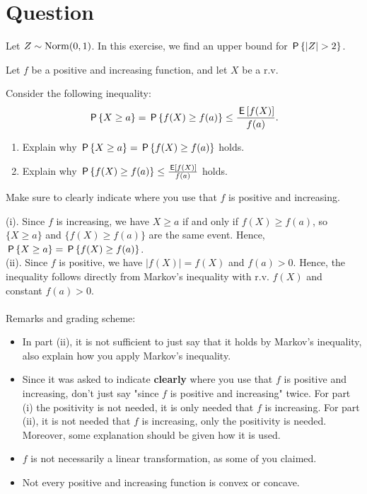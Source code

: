 \section{Question}

Let $Z \sim \Norm{0,1}$. 
In this exercise, we find an upper bound for $\P{|Z| > 2}$.

\begin{exercise}[1.5]
 Let $f$ be a positive and increasing function, and let $X$ be a r.v. 

Consider the following inequality:
$$\P{X \geq a} = \P{f(X) \geq f(a)}   \leq \frac{\E{f(X)}}{f(a)}.$$
\begin{enumerate}
\item[(i)] Explain why $\P{X \geq a} = \P{f(X) \geq f(a)}$ holds. 
\item[(ii)] Explain why $\P{f(X) \geq f(a)}   \leq \frac{\E{f(X)}}{f(a)}$ holds. 
\end{enumerate}
Make sure to clearly indicate where you use that  $f$ is positive and increasing. \\
\begin{solution}
(i). Since $f$ is increasing, we have $X \geq a$ if and only if $f(X) \geq f(a)$, so $\{X \geq a\}$ and $\{f(X) \geq f(a)\}$ are the same event. Hence,  $\P{X \geq a} = \P{f(X) \geq f(a)}$.  \\
(ii). Since $f$ is positive, we have $|f(X)| = f(X)$ and $f(a) > 0$. Hence, the inequality follows directly from Markov's inequality with r.v. $f(X)$ and constant $f(a) > 0$. \\ \\ 
\noindent Remarks and grading scheme:
\begin{itemize}
\item In part (ii), it is not sufficient to just say that it holds by Markov's inequality, also explain how you apply Markov's inequality. 
\item Since it was asked to indicate \textbf{clearly} where you use that  $f$ is positive and increasing, don't just say "since $f$ is positive and increasing" twice. For part (i) the positivity is not needed, it is only needed that $f$ is increasing. For part (ii), it is not needed that $f$ is increasing, only the positivity is needed. Moreover, some explanation should be given how it is used.
\item $f$ is not necessarily a linear transformation, as some of you claimed.
\item Not every positive and increasing function is convex or concave. \\ 

\end{itemize}
\end{solution}
\end{exercise}
